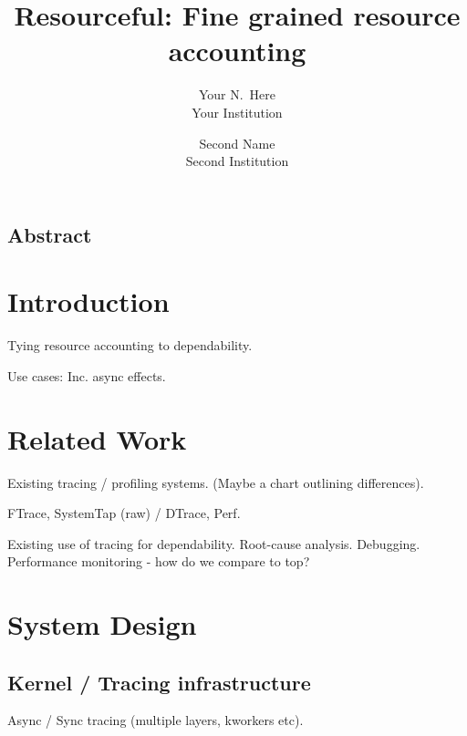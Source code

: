 \documentclass[letterpaper,twocolumn,10pt]{article}
\begin{document}
\date{}

\title{\Large \bf Resourceful: Fine grained resource accounting}

\author{
{\rm Your N.\ Here}\\
Your Institution
\and
{\rm Second Name}\\
Second Institution
} %

\maketitle

\thispagestyle{empty}


\subsection*{Abstract}


\section{Introduction}
Tying resource accounting to dependability.

Use cases:\newline
Inc. async effects.


\section{Related Work}
Existing tracing / profiling systems. (Maybe a chart outlining differences).

FTrace, SystemTap (raw) / DTrace, Perf.

Existing use of tracing for dependability.\newline
Root-cause analysis. Debugging. Performance monitoring - how do we compare to
top?


\section{System Design}
\subsection{Kernel / Tracing infrastructure}
Async / Sync tracing (multiple layers, kworkers etc).
\end{document}
